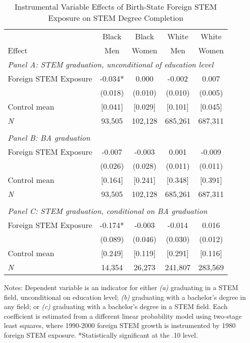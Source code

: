 \begin{table}[ht]
\caption{Instrumental Variable Effects of Birth-State Foreign STEM Exposure on STEM Degree Completion}
\label{tab:ivSTEMgradUncond}
\centering
\begin{threeparttable}
\begin{tabular}{lcccc}
\toprule 
       & Black           & Black        & White        & White       \\
Effect & Men             & Women        & Men          & Women       \\
\midrule 
\multicolumn{5}{l}{\emph{Panel A: STEM graduation, unconditional of education level}}\\ 
Foreign STEM Exposure & -0.034* & 0.000  & -0.002  & 0.007  \\ 
 &  (0.018) & (0.010) & (0.010) & (0.005) \\ 
Control mean &  [0.041] & [0.029] & [0.101] & [0.045] \\ 
\emph{N} &     93,505 &   102,128 &   685,261 &   687,311 \\ 
&&&&\\
\multicolumn{5}{l}{\emph{Panel B: BA graduation}}\\ 
Foreign STEM Exposure & -0.007  & -0.003  & 0.001  & -0.009  \\ 
 &  (0.026) & (0.028) & (0.011) & (0.011) \\ 
Control mean &  [0.164] & [0.241] & [0.348] & [0.391] \\ 
\emph{N} &     93,505 &   102,128 &   685,261 &   687,311 \\ 
&&&&\\
\multicolumn{5}{l}{\emph{Panel C: STEM graduation, conditional on BA graduation}}\\ 
Foreign STEM Exposure & -0.174* & -0.003  & -0.014  & 0.016  \\ 
 &  (0.089) & (0.046) & (0.030) & (0.012) \\ 
Control mean &  [0.249] & [0.119] & [0.291] & [0.116] \\ 
\emph{N} &     14,354 &    26,273 &   241,807 &   283,569 \\ 
\bottomrule 
\end{tabular} 
\footnotesize Notes: Dependent variable is an indicator for either \emph{(a)} graduating in a STEM field, unconditional on education level; \emph{(b)} graduating with a bachelor's degree in any field; or \emph{(c)} graduating with a bachelor's degree in a STEM field. Each coefficient is estimated from a different linear probability model using two-stage least squares, where 1990-2000 foreign STEM growth is instrumented by 1980 foreign STEM exposure. *Statistically significant at the .10 level.
\end{threeparttable} 
\end{table} 
